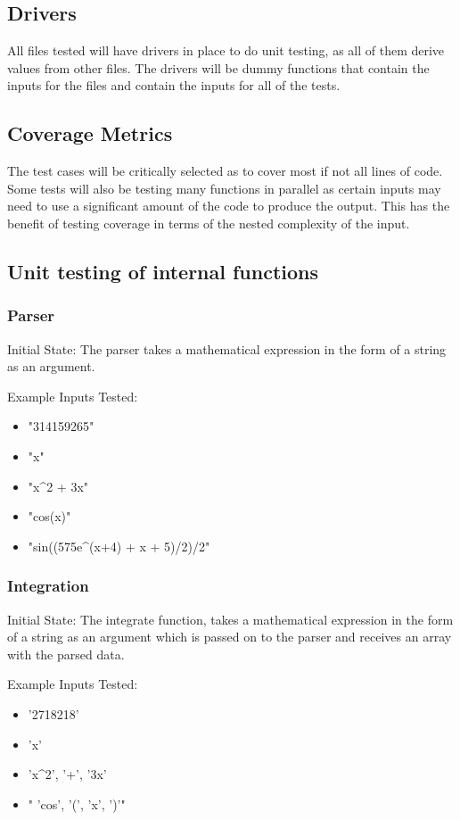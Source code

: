 \documentclass[12pt, titlepage]{article}
\begin{document}
\subsection{Drivers}
All files tested will have drivers in place to do unit testing, as all of them derive values from other files. The drivers will be dummy functions that contain the inputs for the files and contain the inputs for all of the tests.

\subsection{Coverage Metrics}
The test cases will be critically selected as to cover most if not all lines of code. Some tests will also be testing many functions in parallel as certain inputs may need to use a significant amount of the code to produce the output. This has the benefit of testing coverage in terms of the nested complexity of the input.

\subsection{Unit testing of internal functions}

\subsubsection{Parser}
Initial State: The parser takes a mathematical expression in the form of a string as an argument.
\newline

Example Inputs Tested:
\begin{itemize}
\item "314159265"
\item "x"
\item "x\^{}2 + 3x"
\item "cos(x)"
\item "sin((575e\^{}(x+4) + x + 5)/2)/2"
\end{itemize}

\subsubsection{Integration}
Initial State: The integrate function, takes a mathematical expression in the form of a string as an argument which is passed on to the parser and receives an array with the parsed data.
\newline

Example Inputs Tested:
\begin{itemize}
\item '2718218'
\item 'x'
\item 'x\^{}2', '+', '3x'
\item " 'cos', '(', 'x', ')'"
\end{itemize}
\end{document}
